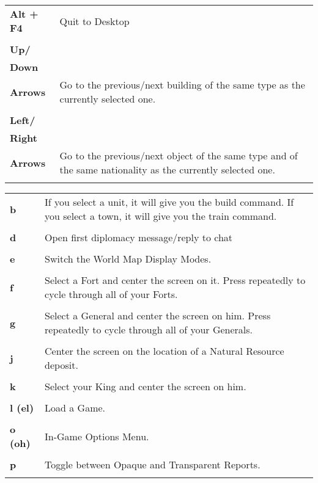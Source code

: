 \begin{tabular}{p{1in} p{3in}}
    \textbf{Alt + F4} & Quit to Desktop\\ \\
    \textbf{Up/}\\
    \textbf{Down}\\
    \textbf{Arrows} & Go to the previous/next building of the same type as the currently selected one.\\ \\    
    \textbf{Left/}\\
    \textbf{Right}\\
    \textbf{Arrows} & Go to the previous/next object of the same type and of the same nationality as the currently selected one.\\ \\
\end{tabular}    

\begin{tabular}{p{1in} p{3in}}
    \textbf{b} & If you select a unit, it will give you the build command. If you select a town, it will give you the train command.\\ \\
        
        
    \textbf{d} & Open first diplomacy message/reply to chat\\ \\
    \textbf{e} & Switch the World Map Display Modes.\\ \\
    \textbf{f} & Select a Fort and center the screen on it. Press repeatedly to cycle through all of your Forts. \\ \\

        
    \textbf{g} & Select a General and center the screen on him. Press repeatedly to cycle through all of your Generals.\\ \\    
    \textbf{j} & Center the screen on the location of a Natural Resource deposit.\\ \\    
    \textbf{k} & Select your King and center the screen on him.\\ \\
    \textbf{l (el)} & Load a Game.\\ \\
    \textbf{o (oh)} & In-Game Options Menu.\\ \\    
    \textbf{p} & Toggle between Opaque and Transparent Reports.\\ \\
\end{tabular}

